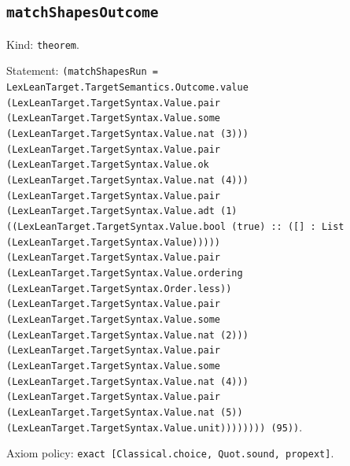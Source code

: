 \documentclass[11pt]{article}
\begin{document}
\subsection*{\texttt{matchShapesOutcome}}
\noindent Kind: \texttt{theorem}.\par
\noindent Statement: \texttt{(matchShapesRun = LexLeanTarget.TargetSemantics.Outcome.value (LexLeanTarget.TargetSyntax.Value.pair (LexLeanTarget.TargetSyntax.Value.some (LexLeanTarget.TargetSyntax.Value.nat (3))) (LexLeanTarget.TargetSyntax.Value.pair (LexLeanTarget.TargetSyntax.Value.ok (LexLeanTarget.TargetSyntax.Value.nat (4))) (LexLeanTarget.TargetSyntax.Value.pair (LexLeanTarget.TargetSyntax.Value.adt (1) ((LexLeanTarget.TargetSyntax.Value.bool (true) :: ([] : List (LexLeanTarget.TargetSyntax.Value))))) (LexLeanTarget.TargetSyntax.Value.pair (LexLeanTarget.TargetSyntax.Value.ordering (LexLeanTarget.TargetSyntax.Order.less)) (LexLeanTarget.TargetSyntax.Value.pair (LexLeanTarget.TargetSyntax.Value.some (LexLeanTarget.TargetSyntax.Value.nat (2))) (LexLeanTarget.TargetSyntax.Value.pair (LexLeanTarget.TargetSyntax.Value.some (LexLeanTarget.TargetSyntax.Value.nat (4))) (LexLeanTarget.TargetSyntax.Value.pair (LexLeanTarget.TargetSyntax.Value.nat (5)) (LexLeanTarget.TargetSyntax.Value.unit)))))))) (95))}.\par
\noindent Axiom policy: \texttt{exact [Classical.choice, Quot.sound, propext]}.\par
\end{document}
